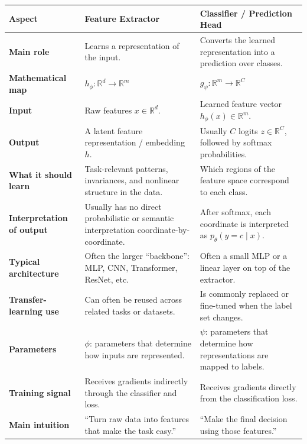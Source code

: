 \documentclass[11pt,a4paper]{article}
\theoremstyle{definition}
\begin{document}
{\footnotesize
\setlength{\tabcolsep}{3pt}
\renewcommand{\arraystretch}{1.2}
\noindent
\begin{tabularx}{\linewidth}{|
  >{\raggedright\arraybackslash}p{2.8cm}|
  >{\raggedright\arraybackslash}X|
  >{\raggedright\arraybackslash}X|
}
\hline
\textbf{Aspect} & \textbf{Feature Extractor} & \textbf{Classifier / Prediction Head} \\
\hline
\textbf{Main role} & Learns a representation of the input. & Converts the learned representation into a prediction over classes. \\
\hline
\textbf{Mathematical map} & $h_{\phi} : \mathbb{R}^d \to \mathbb{R}^m$ & $g_{\psi} : \mathbb{R}^m \to \mathbb{R}^C$ \\
\hline
\textbf{Input} & Raw features $x \in \mathbb{R}^d$. & Learned feature vector $h_{\phi}(x) \in \mathbb{R}^m$. \\
\hline
\textbf{Output} & A latent feature representation / embedding $h$. & Usually $C$ logits $z \in \mathbb{R}^C$, followed by softmax probabilities. \\
\hline
\textbf{What it should learn} & Task-relevant patterns, invariances, and nonlinear structure in the data. & Which regions of the feature space correspond to each class. \\
\hline
\textbf{Interpretation of output} & Usually has no direct probabilistic or semantic interpretation coordinate-by-coordinate. & After softmax, each coordinate is interpreted as $p_{\theta}(y = c \mid x)$. \\
\hline
\textbf{Typical architecture} & Often the larger ``backbone'': MLP, CNN, Transformer, ResNet, etc. & Often a small MLP or a linear layer on top of the extractor. \\
\hline
\textbf{Transfer-learning use} & Can often be reused across related tasks or datasets. & Is commonly replaced or fine-tuned when the label set changes. \\
\hline
\textbf{Parameters} & $\phi$: parameters that determine how inputs are represented. & $\psi$: parameters that determine how representations are mapped to labels. \\
\hline
\textbf{Training signal} & Receives gradients indirectly through the classifier and loss. & Receives gradients directly from the classification loss. \\
\hline
\textbf{Main intuition} & ``Turn raw data into features that make the task easy.'' & ``Make the final decision using those features.'' \\
\hline
\end{tabularx}
}
\end{document}
